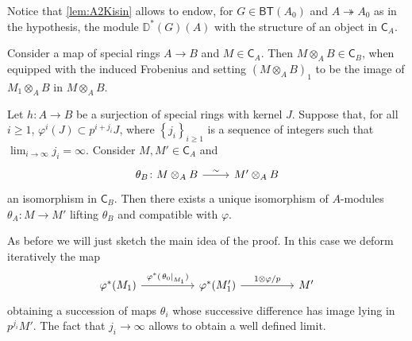 \begin{rem}[]
	Notice that \cref{lem:A2Kisin} allows to endow,
	for $G \in \mathsf{BT}(A_0)$ and $A \twoheadrightarrow A_0$ as in the hypothesis,
	the module $\mathbb{D}^*(G)(A)$ with the structure of an object in $\mathsf{C}_A$.
\end{rem}


\begin{defn}[]
	Consider a map of special rings $A \to B$ and $M \in \mathsf{C}_A$.
	Then $M \otimes_A B \in \mathsf{C}_B$, when equipped with
	the induced Frobenius %
	and setting
	$\left( M \otimes_A B \right)_1$ to be the image of
	$M_1 \otimes_A B$ in $M \otimes_A B$.
\end{defn}


\begin{lem}\label{lem:A4Kisin}
	Let $h\colon A \to B$ be a surjection of special rings with kernel $J$.
	Suppose that, for all $i \geq 1$, $\varphi^i(J) \subset p^{i + j_i} J$,
	where $\left\{ j_i \right\}_{i \geq 1}$ is a sequence of integers
	such that $\lim_{i \to \infty} j_i = \infty$.
	Consider $M, M' \in \mathsf{C}_A$ and
	\begin{equation*}
	\begin{tikzcd}[row sep = 0ex
		,/tikz/column 1/.append style={anchor=base east}
		,/tikz/column 2/.append style={anchor=base west}]
		\theta_B\colon M \otimes_A B 
		\arrow[r, "\sim", rightarrow] &
		M' \otimes_A B
	\end{tikzcd}
	\end{equation*} 
	an isomorphism in $\mathsf{C}_B$.
	Then there exists a unique isomorphism of $A$-modules
	$\theta_A\colon M \to M'$ lifting $\theta_B$ and compatible with $\varphi$.
\end{lem} 


\begin{rem}[]
	As before we will just sketch the main idea of the proof.
	In this case we deform iteratively the map
	\begin{equation*}
	\begin{tikzcd}[column sep=4.8em]
		\varphi^*(M_1) \arrow[r, "\varphi^*(\left.\theta_0\right|_{ M_1 })", rightarrow] &
		\varphi^*(M_1') \arrow[r, "1 \otimes \varphi/p", rightarrow] &
		M'
	\end{tikzcd}
	\end{equation*}
	obtaining a succession of maps $\theta_i$ whose successive difference
	has image lying in $p^{j_i}M'$.
	The fact that $j_i \to \infty$ allows to obtain a well defined limit.
\end{rem}


